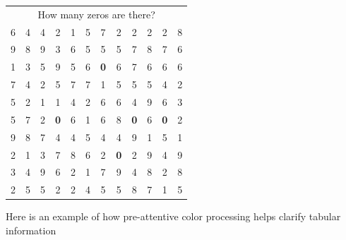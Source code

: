 \documentclass[10pt]{beamer}
\begin{document}
\begin{frame}
{\scriptsize
\begin{center}
\begin{tabular}{cccccccccccc}
\multicolumn{12}{c}{How many zeros are there?}\\
6     & 4    & 4    & 2    & 1    & 5    & 7    & 2    & 2    & 2    & 2    & 8    \\
9     & 8    & 9    & 3    & 6    & 5    & 5    & 5    & 7    & 8    & 7    & 6    \\
1     & 3    & 5    & 9    & 5    & 6    & {\large \bf \color{red}0}    & 6    & 7    & 6    & 6    & 6    \\
7     & 4    & 2    & 5    & 7    & 7    & 1    & 5    & 5    & 5    & 4    & 2   \\
5     & 2    & 1    & 1    & 4    & 2    & 6    & 6    & 4    & 9    & 6    & 3    \\
5     & 7    & 2    & {\large \bf \color{red}0}    & 6    & 1    & 6    & 8    & {\large \bf \color{red}0}    & 6    & {\large \bf \color{red}0}    & 2    \\
9     & 8    & 7    & 4    & 4    & 5    & 4    & 4    & 9    & 1    & 5    & 1    \\
2     & 1    & 3    & 7    & 8    & 6    & 2    & {\large \bf \color{red}0}    & 2    & 9    & 4    & 9    \\
3     & 4    & 9    & 6    & 2    & 1    & 7    & 9    & 4    & 8    & 2    & 8    \\
2     & 5    & 5    & 2    & 2    & 4    & 5    & 5    & 8    & 7    & 1    & 5    \\
\end{tabular}
\end{center}
}

{\scriptsize Here is an example of how pre-attentive color processing helps clarify tabular information\\}

\end{frame}
\end{document}
